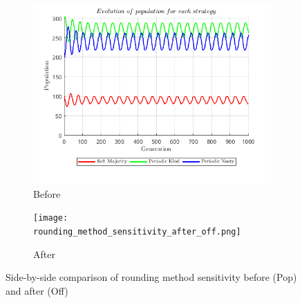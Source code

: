 \documentclass[12pt]{report}
\begin{document}
\begin{figure}[H]
 \begin{subfigure}[t]{0.45\textwidth}
        \centering
        \includegraphics[width=\textwidth]{rounding_method_sensitivity_before_pop.png}
        \caption{Before}
    \end{subfigure}
    \hfill
    \begin{subfigure}[t]{0.45\textwidth}
        \centering
        \texttt{[image: rounding\_method\_sensitivity\_after\_off.png]}
        \caption{After}
    \end{subfigure}
    \caption{Side-by-side comparison of rounding method sensitivity before (Pop) and after (Off)}
\end{figure}

\newpage
\end{document}

